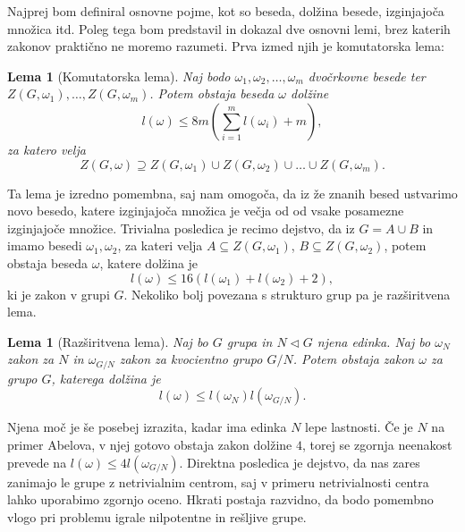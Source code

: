 \documentclass[12pt,a4paper]{article}
\newcounter{theoremcounter}[section] %
\newtheorem{lema}[theoremcounter]{Lema}
\begin{document}
Najprej bom definiral osnovne pojme, kot so beseda, dolžina besede, izginjajoča množica itd. Poleg tega bom predstavil in dokazal dve osnovni lemi, brez katerih zakonov praktično ne moremo razumeti. Prva izmed njih je komutatorska lema:
\begin{lema}[Komutatorska lema]
    Naj bodo $\omega_1, \omega_2, \ldots, \omega_m$ dvočrkovne besede ter $Z(G, \omega_1), \ldots, Z(G, \omega_m)$. Potem obstaja beseda $\omega$ dolžine \begin{equation*}
    l(\omega) \le  8m\left(\sum_{i=1}^{m} l\left(\omega_i\right) + m\right),
    \end{equation*}  
    za katero velja \begin{equation*}
    Z(G, \omega) \supseteq Z(G, \omega_1) \cup  Z(G, \omega_2) \cup \ldots \cup Z(G, \omega_m).
    \end{equation*}  
    \end{lema}Ta lema je izredno pomembna, saj nam omogoča, da iz že znanih besed ustvarimo novo besedo, katere izginjajoča množica je večja od od vsake posamezne izginjajoče množice. Trivialna posledica je recimo dejstvo, da iz $G = A \cup B$ in imamo
besedi $\omega_1, \omega_2$, za kateri velja $A \subseteq Z(G, \omega_1)$, $B \subseteq Z(G, \omega_2)$, potem obstaja beseda $\omega$, katere dolžina je \begin{equation*}
l(\omega) \le  16 (l(\omega_1) + l(\omega_2) + 2),
\end{equation*}  
ki je zakon v grupi $G$.
Nekoliko bolj povezana s strukturo grup pa je razširitvena lema.  \begin{lema}[Razširitvena lema]
    Naj bo $G$ grupa in $N \triangleleft G$ njena edinka. Naj bo $\omega_N$ zakon za $N$ in
    $\omega_{G/N}$ zakon za kvocientno grupo $G/N$. Potem obstaja zakon $\omega$ za grupo $G$, katerega dolžina je \begin{equation*}
    l(\omega) \le  l(\omega_N)l(\omega_{G/N}).
    \end{equation*}  
    \end{lema}
Njena moč je še posebej izrazita, kadar ima edinka $N$ lepe lastnosti. Če je $N$ na primer Abelova, v njej gotovo obstaja zakon dolžine $4$, torej se zgornja neenakost prevede na $l(\omega) \le 4 l(\omega_{G/N})$. Direktna posledica je dejstvo, da
nas zares zanimajo le grupe z netrivialnim centrom, saj v primeru netrivialnosti centra lahko uporabimo zgornjo oceno. Hkrati postaja razvidno, da bodo pomembno vlogo pri problemu igrale nilpotentne in rešljive grupe.
\end{document}
